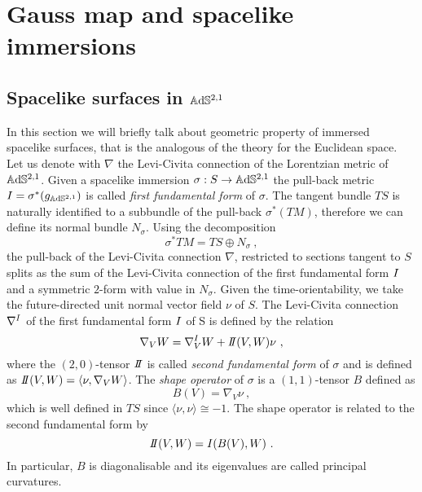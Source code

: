 \chapter{Gauss map and spacelike immersions}

\section{Spacelike surfaces in $\mathbb{A}\mathrm{d}\mathbb{S}^{2,1}$}
In this section we will briefly talk about geometric property of immersed spacelike surfaces, that is the analogous of the theory for the Euclidean space.\\
Let us denote with $\nabla$ the Levi-Civita connection of the Lorentzian metric of $\mathbb{A}\mathrm{d}\mathbb{S}^{2,1}$. Given a spacelike immersion $\sigma: S\to\mathbb{A}\mathrm{d}\mathbb{S}^{2,1}$ the pull-back metric $I = \sigma^*(g_{\mathbb{A}\mathrm{d}\mathbb{S}^{2,1}})$ is called \textit{first fundamental form} of $\sigma$.
The tangent bundle $TS$ is naturally identified to a subbundle of the pull-back $\sigma^*(TM)$, therefore we can define its normal bundle $N_\sigma$. Using the decomposition
\[
    \sigma^* TM = TS \oplus N_\sigma \ ,
\]
the pull-back of the Levi-Civita connection $\nabla$, restricted to sections tangent to $S$ splits as the sum of the Levi-Civita connection of the first fundamental form $I$ and a symmetric $2$-form with value in $N_\sigma$. Given the time-orientability, we take the future-directed unit normal vector field $\nu$ of $S$. The Levi-Civita connection $\nabla^I$ of the first fundamental form $I$ of S is defined by the relation
\begin{equation} \label{eq:levi}
    \nabla_V W= \nabla^\I_V W + \II(V,W)\nu \ ,
\end{equation} 
where the $(2,0)$-tensor $\II$ is called \textit{second fundamental form} of $\sigma$ and is defined as $\II(V,W)=\langle \nu, \nabla_V W \rangle$. The \textit{shape  operator} of $\sigma$ is a $(1,1)$-tensor $B$ defined as
\[
    B(V) = \nabla_V \nu \ ,
\]
which is well defined in $TS$ since $\langle \nu,\nu \rangle \cong -1$. The shape operator is related to the second fundamental form by
\[
    \II(V,W) = \I(B(V),W) \ .
\]
In particular, $B$ is diagonalisable and its eigenvalues are called principal curvatures.\\

